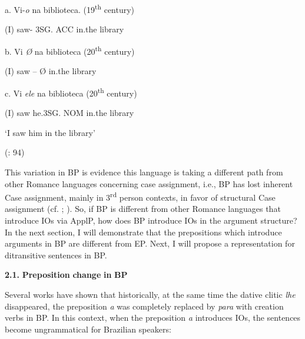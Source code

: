 \documentclass[output=paper,modfonts,nonflat]{langsci/langscibook}
\begin{document}
\begin{styleEstiloi}
\ea%
    \label{ex:key:10}
    \gll\\
        \\
    \glt
    \z

         a. Vi-\textit{o}                            na     biblioteca.    (19\textsuperscript{th} century)
\end{styleEstiloi}

\begin{styleEstiloi}
            (I) saw- 3SG. ACC\textsuperscript{}     in.the     library 
\end{styleEstiloi}

         b. Vi \textit{Ø}    na   biblioteca      (20\textsuperscript{th} century) 

             (I) saw – Ø  in.the  library     

         c. Vi        \textit{ele}                     na        biblioteca    (20\textsuperscript{th} century) 

    (I) saw    he.3SG. NOM  in.the  library  

              ‘I saw him in the library’

            (\citealt{CarvalhoCalindro2018}: 94)

This variation in BP is evidence this language is taking a different path from other Romance languages concerning case assignment, i.e., BP has lost inherent Case assignment, mainly in 3\textsuperscript{rd} person contexts, in favor of structural Case assignment (cf. \citealt{Calindro2015}; \citealt{CarvalhoCalindro2017}). So, if BP is different from other Romance languages that introduce IOs via ApplP, how does BP introduce IOs in the argument structure? In the next section, I will demonstrate that the prepositions which introduce arguments in BP are different from EP. Next, I will propose a representation for ditransitive sentences in BP.

\textbf{2.1.} \textbf{Preposition} \textbf{change} \textbf{in} \textbf{BP}

Several works have shown that historically, at the same time the dative clitic \textit{lhe} disappeared, the preposition \textit{a} was completely replaced by \textit{para} with creation verbs in BP. In this context, when the preposition \textit{a} introduces IOs, the sentences become ungrammatical for Brazilian speakers:

\ea%
    \label{ex:key:11}
    \gll\\
        \\
    \glt
    \z
\end{document}
